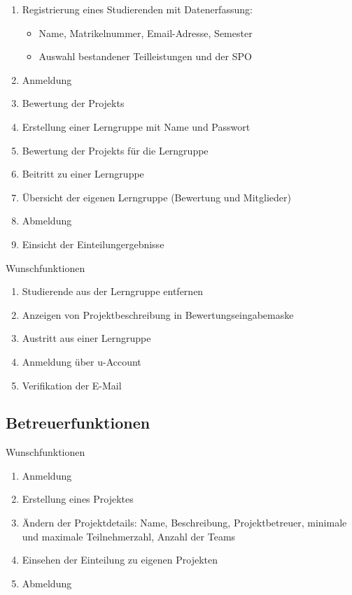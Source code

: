 \documentclass[parskip=full]{scrartcl}
\newcommand{\swtLabel}[1]{\textbf{\textbackslash #1\arabic*0\textbackslash}}
\begin{document}
\begin{enumerate}[label=\swtLabel{FA}]
  \item Registrierung eines Studierenden mit Datenerfassung:
  \begin{itemize}
    \item Name, Matrikelnummer, Email-Adresse, Semester
    \item Auswahl bestandener Teilleistungen und der \gls{SPO}
  \end{itemize}
  \item Anmeldung
  \item Bewertung der \glspl{Projekt}
  \item Erstellung einer Lerngruppe mit Name und Passwort
  \item Bewertung der \glspl{Projekt} für die Lerngruppe
  \item Beitritt zu einer Lerngruppe
  \item Übersicht der eigenen Lerngruppe (Bewertung und Mitglieder)
  \item Abmeldung
  \item Einsicht der Einteilungergebnisse
\end{enumerate}

Wunschfunktionen

\begin{enumerate}[label=\swtLabel{FA}, resume]
	\item Studierende aus der Lerngruppe entfernen
	\item Anzeigen von Projektbeschreibung in Bewertungseingabemaske
	\item Austritt aus einer Lerngruppe
	\item Anmeldung über u-Account
	\item Verifikation der E-Mail
\end{enumerate}

\subsection{Betreuerfunktionen}

Wunschfunktionen

\begin{enumerate}[label=\swtLabel{FA}, resume]
  \item Anmeldung
  \item Erstellung eines Projektes
  \item Ändern der Projektdetails: Name, Beschreibung, Projektbetreuer,
        minimale und maximale Teilnehmerzahl, Anzahl der Teams
  \item Einsehen der Einteilung zu eigenen Projekten
  \item Abmeldung
\end{enumerate}
\end{document}
